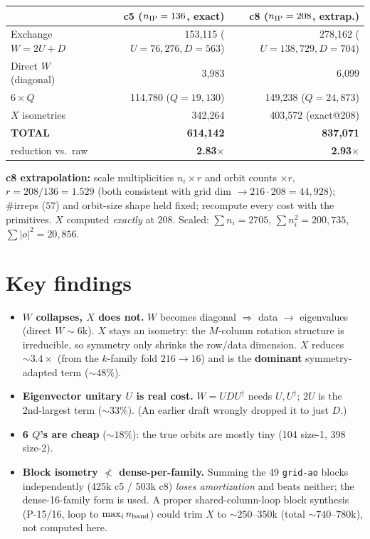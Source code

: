 \documentclass[11pt]{article}
\newcommand{\code}[1]{\texttt{\small #1}}
\begin{document}
\begin{center}\begin{tabular}{lrr}
\toprule
 & c5 ($n_{\rm IP}=136$, exact) & c8 ($n_{\rm IP}=208$, extrap.)\\\midrule
Exchange $W=2U+D$ & 153{,}115 \small($U{=}76{,}276,D{=}563$) & 278{,}162 \small($U{=}138{,}729,D{=}704$)\\
Direct $W$ (diagonal) & 3{,}983 & 6{,}099\\
$6\times Q$ & 114{,}780 \small($Q{=}19{,}130$) & 149{,}238 \small($Q{=}24{,}873$)\\
$X$ isometries & 342{,}264 & 403{,}572 \small(exact@208)\\
\textbf{TOTAL} & \textbf{614{,}142} & \textbf{837{,}071}\\
reduction vs.\ raw & \textbf{2.83$\times$} & \textbf{2.93$\times$}\\
\bottomrule
\end{tabular}\end{center}

\textbf{c8 extrapolation:} scale multiplicities $n_i\times r$ and orbit counts $\times r$,
$r=208/136=1.529$ (both consistent with grid dim $\to 216\cdot208=44{,}928$); \#irreps ($57$) and
orbit-size shape held fixed; recompute every cost with the primitives. $X$ computed \emph{exactly} at
$208$. Scaled: $\sum n_i{=}2705$, $\sum n_i^2{=}200{,}735$, $\sum|o|^2{=}20{,}856$.

\section*{Key findings}
\begin{itemize}\itemsep0pt
\item \textbf{$W$ collapses, $X$ does not.} $W$ becomes diagonal $\Rightarrow$ data $\to$ eigenvalues
      (direct $W\!\sim\!6$k). $X$ stays an isometry: the $M$-column rotation structure is irreducible, so
      symmetry only shrinks the row/data dimension. $X$ reduces $\sim\!3.4\times$ (from the $k$-family
      fold $216\!\to\!16$) and is the \textbf{dominant} symmetry-adapted term ($\sim48\%$).
\item \textbf{Eigenvector unitary $U$ is real cost.} $W=UDU^\dagger$ needs $U,U^\dagger$; $2U$ is the
      2nd-largest term ($\sim33\%$). (An earlier draft wrongly dropped it to just $D$.)
\item \textbf{6 $Q$'s are cheap} ($\sim18\%$): the true orbits are mostly tiny (104 size-1, 398 size-2).
\item \textbf{Block isometry $\not<$ dense-per-family.} Summing the 49 \code{grid-ao} blocks
      independently (425k c5 / 503k c8) \emph{loses amortization} and beats neither; the dense-16-family
      form is used. A proper shared-column-loop block synthesis (P-15/16, loop to $\max_i n_{\rm band}$)
      could trim $X$ to $\sim\!250$--$350$k (total $\sim\!740$--$780$k), not computed here.
\end{itemize}
\end{document}
